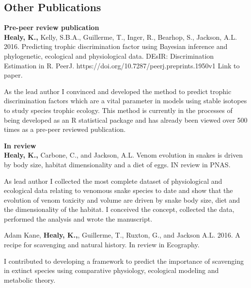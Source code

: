 \documentclass[10pt,a4paper]{article}
\begin{document}
\begin{flushleft}
\bigskip

\section{Other Publications}
\textbf{Pre-peer review publication}\\
\setlength{\parindent}{0mm}\textbf{Healy, K.,} Kelly, S.B.A., Guillerme, T., Inger, R., Bearhop, S., Jackson, A.L. 2016. Predicting trophic discrimination factor using Bayesian inference and phylogenetic, ecological and physiological data. DEsIR: Discrimination Estimation in R. PeerJ. {https://doi.org/10.7287/peerj.preprints.1950v1 Link to paper}.
\smallskip
\par{\fontsize{10.5}{10} As the lead author I convinced and developed the method to predict trophic discrimination factors which are a vital parameter in models using stable isotopes to study species trophic ecology. This method is currently in the processes of being developed as an R statistical package and has already been viewed over 500 times as a pre-peer reviewed publication.}

\bigskip

\textbf{In review}\\
\setlength{\parindent}{0mm}\textbf{Healy, K.,} Carbone, C., and Jackson, A.L. Venom evolution in snakes is driven by body size, habitat dimensionality and a diet of eggs. IN review in  PNAS.
\smallskip
\par{\fontsize{10.5}{10} As lead author I collected the most complete dataset of physiological and ecological data relating to venomous snake species to date and show that the evolution of venom toxicity and volume are driven by snake body size, diet and the dimensionality of the habitat. I conceived the concept, collected the data, performed the analysis and wrote the manuscript.}

\bigskip

\setlength{\parindent}{0mm} Adam Kane, \textbf{Healy, K.,}, Guillerme, T., Ruxton, G., and Jackson A.L. 2016. A recipe for scavenging and natural history. In review in Ecography.
\smallskip
\par{\fontsize{10.5}{10} I contributed to developing a framework to predict the importance of scavenging in extinct species using comparative physiology, ecological modeling and metabolic theory.}

\bigskip

\end{flushleft}

\end{document}
